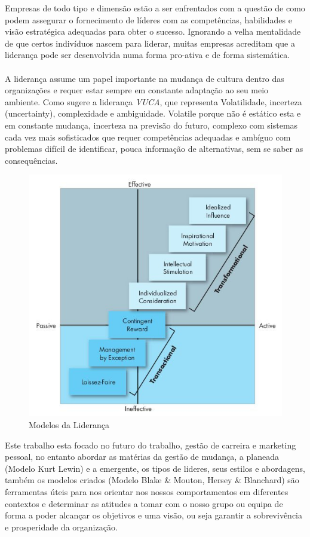 Empresas de todo tipo e dimensão estão a ser enfrentados com a questão de como podem assegurar o fornecimento de líderes com as competências, habilidades e visão estratégica adequadas para obter o sucesso. Ignorando a velha mentalidade de que certos indivíduos nascem para liderar, muitas empresas acreditam que a liderança pode ser desenvolvida numa forma pro-ativa e de forma sistemática. \cite{book_6}\\
\\
A liderança assume um papel importante na mudança de cultura dentro das organizações e requer estar sempre em constante adaptação ao seu meio ambiente. Como sugere a liderança \textit{VUCA}, que representa Volatilidade, incerteza (uncertainty), complexidade e ambiguidade. Volatile porque não é estático esta e em constante mudança, incerteza na previsão do futuro, complexo com sistemas cada vez mais sofisticados que requer competências adequadas e ambíguo com problemas difícil de identificar, pouca informação de alternativas, sem se saber as consequências.
\begin{figure}[H]
	\centering
	\includegraphics[scale=0.52]{./image/Leadership/Leadership Models.jpg}
	\caption{Modelos da Liderança \cite{book_2}}
\end{figure}
Este trabalho esta focado no futuro do trabalho, gestão de carreira e marketing pessoal, no entanto abordar as matérias da gestão de mudança, a planeada (Modelo Kurt Lewin) e a emergente, os tipos de lideres, seus estilos e abordagens, também os modelos criados (Modelo Blake \& Mouton, Hersey \& Blanchard) são ferramentas úteis para nos orientar nos nossos comportamentos em diferentes contextos e determinar as atitudes a tomar com o nosso grupo ou equipa de forma a poder alcançar os objetivos e uma visão, ou seja garantir a sobrevivência e prosperidade da organização.
